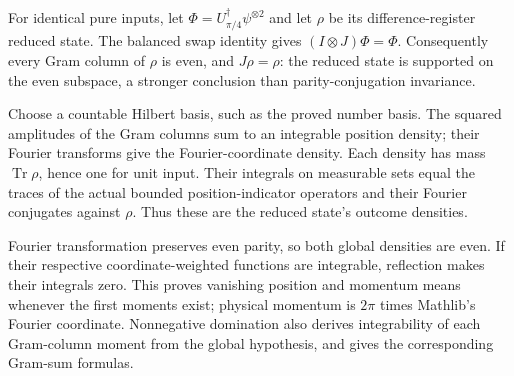 \begin{lemma}\label{lem:difference-parity}
  \leanok
  \par
  For identical pure inputs, let
  $\Phi=U_{\pi/4}^{\dagger}\psi^{\otimes2}$ and let $\rho$ be its
  difference-register reduced state. The balanced swap identity gives
  $(I\otimes J)\Phi=\Phi$. Consequently every Gram column of $\rho$
  is even, and $J\rho=\rho$: the reduced state is supported on the even
  subspace, a stronger conclusion than parity-conjugation invariance.

  Choose a countable Hilbert basis, such as the proved number basis.
  The squared amplitudes of the Gram columns sum to an integrable position
  density; their Fourier transforms give the Fourier-coordinate density.
  Each density has mass $\operatorname{Tr}\rho$, hence one for unit input.
  Their integrals on measurable sets equal the traces of the actual bounded
  position-indicator operators and their Fourier conjugates against $\rho$.
  Thus these are the reduced state's outcome densities.

  Fourier transformation preserves even parity, so both global densities
  are even. If their respective coordinate-weighted functions are
  integrable, reflection makes their integrals zero. This proves vanishing
  position and momentum means whenever the first moments exist; physical
  momentum is $2\pi$ times Mathlib's Fourier coordinate. Nonnegative
  domination also derives integrability of each Gram-column moment from
  the global hypothesis, and gives the corresponding Gram-sum formulas.
\end{lemma}

